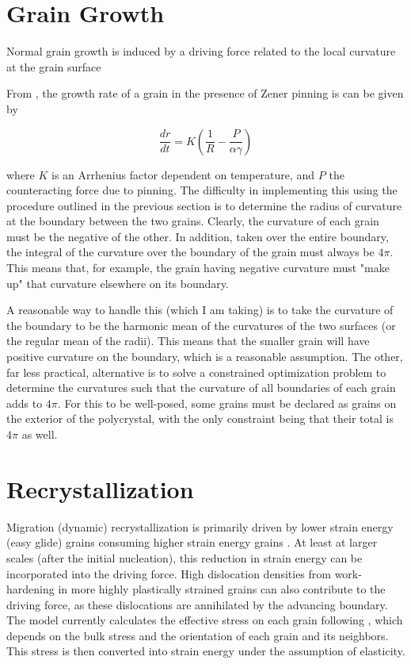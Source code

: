 \documentclass{article}
\begin{document}
\section{Grain Growth}
Normal grain growth is induced by a driving force related to the local curvature at the grain surface

From \citet{durand2006}, the growth rate of a grain in the presence of Zener pinning is can be given by

\[\frac{dr}{dt} = K \left( \frac{1}{R}-\frac{P}{\alpha \gamma} \right)
\]

where $K$ is an Arrhenius factor dependent on temperature, and $P$ the counteracting force due to pinning. The difficulty in implementing this using the procedure outlined in the previous section is to determine the radius of curvature at the boundary between the two grains. Clearly, the curvature of each grain must be the negative of the other. In addition, taken over the entire boundary, the integral of the curvature over the boundary of the grain must always be $4 \pi$. This means that, for example, the grain having negative curvature must "make up" that curvature elsewhere on its boundary. 

A reasonable way to handle this (which I am taking)  is to take the curvature of the boundary to be the harmonic mean of the curvatures of the two surfaces (or the regular mean of the radii). This means that the smaller grain will have positive curvature on the boundary, which is a reasonable assumption. The other, far less practical, alternative is to solve a constrained optimization problem to determine the curvatures such that the curvature of all boundaries of each grain adds to $4 \pi$. For this to be well-posed, some grains must be declared as grains on the exterior of the polycrystal, with the only constraint being that their total is $4 \pi$ as well. 




\section{Recrystallization}
Migration (dynamic) recrystallization is primarily driven by lower strain energy (easy glide) grains consuming higher strain energy grains \citep{duval1995}. At least at larger scales (after the initial nucleation), this reduction in strain energy can be incorporated into the driving force. High dislocation densities from work-hardening in more highly plastically strained grains can also contribute to the driving force, as these dislocations are annihilated by the advancing boundary. The model currently calculates the effective stress on each grain following \citet{azuma96}, which depends on the bulk stress and the orientation of each grain and its neighbors. This stress is then converted into strain energy under the assumption of elasticity.



\end{document}
